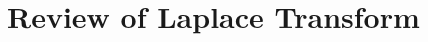 \documentclass[../course]{subfiles}
\begin{document}
\chapter{Review of Laplace Transform} \label{chp:ch06LaplaceTransform}


\end{document}
